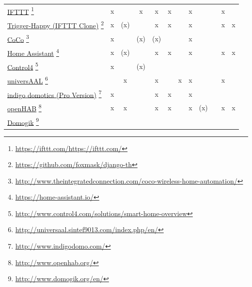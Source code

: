\begin{longtable}{R{4cm} | c  | c | c | c | c | c | c | c | c | c | c}
	& 
	& 
	& 
	& 
	& 
	& 
	& 
	& 
	& 
	& 
	&  \\
\midrule
\endhead
\hyperlink{https://ifttt.com/}{IFTTT}  \footnote{\url{https://ifttt.com/https://ifttt.com/}}	
	& 	x
	&	
	&	x		
	& 	x 
	&	x
	&	
	&	x
	&	
	&
	& 	x
	&	\\
\midrule
\hyperlink{https://github.com/foxmask/django-th}{Trigger-Happy (IFTTT Clone)} \footnote{\url{https://github.com/foxmask/django-th}}
	& 	x
	&	(x)
	&			
	& 	x 
	&	x
	&	
	&	x
	&	
	&
	& 	x	
	&	x\\
\midrule
\hyperlink{http://www.theintegratedconnection.com/coco-wireless-home-automation/}{CoCo}  \footnote{\url{http://www.theintegratedconnection.com/coco-wireless-home-automation/}}
	& 	x
	&	
	&	(x)\footnotemark[11]
	& 	(x)\footnotemark[11]
	&	
	&	
	&	x
	&	
	&
	&	
	&	\footnotemark[12] \\
\midrule
\hyperlink{https://home-assistant.io/}{Home Assistant} \footnote{\url{https://home-assistant.io/}}	
	& 	x
	&	(x)	
	&	
	& 	x
	&	x
	&	
	&	x
	&	
	&
	& 	x
	&	x\\
\midrule
\hyperlink{http://www.control4.com/solutions/smart-home-overview}{Control4} \footnote{\url{http://www.control4.com/solutions/smart-home-overview}}	
	&	x
	&	
	&	(x)\footnotemark[11]
	&	\footnotemark[12]
	&
	&
	&	\footnotemark[12]
	&	\footnotemark[12]
	&	\footnotemark[12]
	&	
	&  \footnotemark[12] \\
\midrule
\hyperlink{http://universaal.sintef9013.com/index.php/en/}{universAAL} \footnote{\url{http://universaal.sintef9013.com/index.php/en/}}	
	& 
	&	x
	&	
	&	x
	&	
	&	x
	&	x
	&
	&
	&	x 
	&  \footnotemark[12] \\
\midrule
\hyperlink{http://www.indigodomo.com/}{indigo domotics (Pro Version)} \footnote{\url{http://www.indigodomo.com/}}	
	& 	x
	& 
	&	
	&	x
	&	x
	&	
	&	x
	&	
	&	
	&
	&	\\
\midrule
\hyperlink{http://www.openhab.org/}{openHAB} \footnote{\url{http://www.openhab.org/}}	
	&	x
	&	x
	&	
	&	x
	&	x
	&	
	&	x
	&	(x)\footnotemark[12]
	&	
	&	x 
	&	x\\
\midrule
\hyperlink{http://www.domogik.org/en/}{Domogik} \footnote{\url{http://www.domogik.org/en/}}	

\end{longtable}
